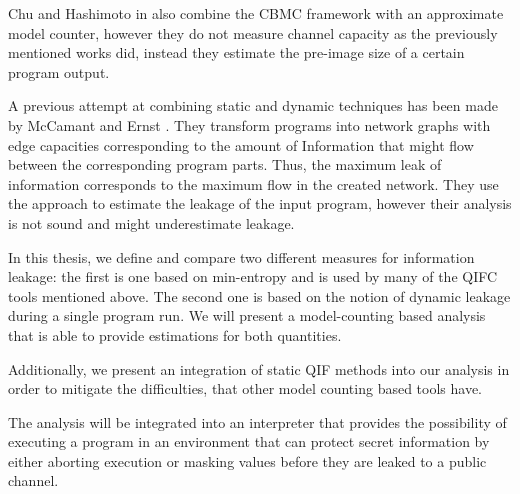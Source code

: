 Chu and Hashimoto in \cite{chu19} also combine the CBMC framework with an approximate model counter, however they do not measure channel capacity as the previously mentioned works did, instead they estimate the pre-image size of a certain program output.

A previous attempt at combining static and dynamic techniques has been made by McCamant and Ernst \cite{mccamant08}. They transform programs into network graphs with edge capacities corresponding to the amount of Information that might flow between the corresponding program parts. Thus, the maximum leak of information corresponds to the maximum flow in the created network. They use the approach to estimate the leakage of the input program, however their analysis is not sound and might underestimate leakage.

\pagebreak

In this thesis, we define and compare two different measures for information leakage: the first is one based on min-entropy and is used by many of the QIFC tools mentioned above. The second one is based on the notion of dynamic leakage during a single program run. We will present a model-counting based analysis that is able to provide estimations for both quantities.

Additionally, we present an integration of static QIF methods into our analysis in order to mitigate the difficulties, that other model counting based tools have.

The analysis will be integrated into an interpreter that provides the possibility of executing a program in an environment that can protect secret information by either aborting execution or masking values before they are leaked to a public channel.

